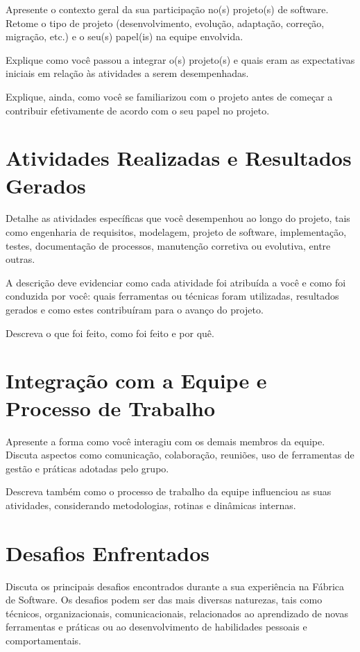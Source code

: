 Apresente o contexto geral da sua participação no(s) projeto(s) de software. Retome o tipo de projeto (desenvolvimento, evolução, adaptação, correção, migração, etc.) e o seu(s) papel(is) na equipe envolvida. 

Explique como você passou a integrar o(s) projeto(s) e quais eram as expectativas iniciais em relação às atividades a serem desempenhadas.

Explique, ainda, como você se familiarizou com o projeto antes de começar a contribuir efetivamente de acordo com o seu papel no projeto.

\section{Atividades Realizadas e Resultados Gerados}

Detalhe as atividades específicas que você desempenhou ao longo do projeto, tais como engenharia de requisitos, modelagem, projeto de software, implementação, testes, documentação de processos, manutenção corretiva ou evolutiva, entre outras. 

A descrição deve evidenciar como cada atividade foi atribuída a você e como foi conduzida por você: quais ferramentas ou técnicas foram utilizadas, resultados gerados e como estes contribuíram para o avanço do projeto.

Descreva o que foi feito, como foi feito e por quê.

\section{Integração com a Equipe e Processo de Trabalho}

Apresente a forma como você interagiu com os demais membros da equipe. Discuta aspectos como comunicação, colaboração, reuniões, uso de ferramentas de gestão e práticas adotadas pelo grupo. 

Descreva também como o processo de trabalho da equipe influenciou as suas atividades, considerando metodologias, rotinas e dinâmicas internas.

\section{Desafios Enfrentados}

Discuta os principais desafios encontrados durante a sua experiência na Fábrica de Software. Os desafios podem ser das mais diversas naturezas, tais como técnicos, organizacionais, comunicacionais, relacionados ao aprendizado de novas ferramentas e práticas ou ao desenvolvimento de habilidades pessoais e comportamentais. 


